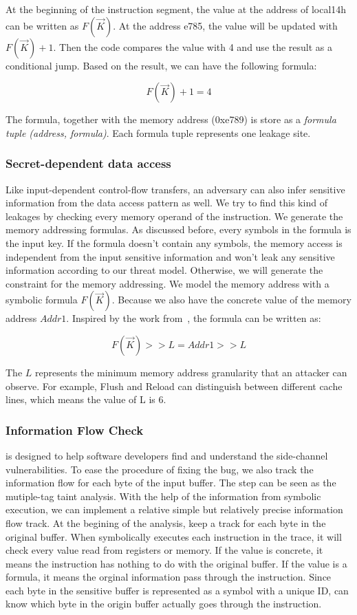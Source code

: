At the beginning of the instruction segment, the value at the 
address of local14h can be written as $F(\vec{K})$. At the address e785, 
the value will be updated with $F(\vec{K})+1$. Then the code compares 
the value with 4 and use the result as a conditional jump. 
Based on the result, we can have the following formula:

$$F(\vec{K}) + 1 = 4$$

The formula, together with the memory address (0xe789) is store
as a \textit{formula tuple (address, formula)}. 
Each formula tuple represents one leakage site.

\subsubsection{Secret-dependent data access}
Like input-dependent control-flow transfers, an adversary can also infer 
sensitive information from the data access pattern as well. 
We try to find this kind of leakages by checking 
every memory operand of the instruction. We generate the memory addressing 
formulas. As discussed before, every symbols in the formula is the input key. 
If the formula doesn’t contain any symbols, the memory access is independent 
from the input sensitive information and won’t leak any sensitive information 
according to our threat model. Otherwise, we will generate the constraint for
the memory addressing. We model the memory address with a symbolic formula 
$F(\vec{K})$. 
Because we also have the concrete value of the memory address $Addr1$. 
Inspired by the work from~\cite{203878}, the formula can be written as:

$$F(\vec{K}) >> L = Addr1 >> L$$

The $L$ represents the minimum memory address granularity that an attacker 
can observe. For example, Flush and Reload can distinguish between different
cache lines, which means the value of L is 6.

\subsubsection{Information Flow Check}
\tool{} is designed to help software developers find and understand the 
side-channel vulnerabilities. To ease the procedure of fixing the bug,
we also track the information flow for each byte of the input
buffer. 
The step can be seen as the mutiple-tag taint analysis.
With the help of the information from symbolic execution, we can implement
a relative simple but relatively precise information flow track.
At the begining of the analysis, \tool{} keep a track for each byte 
in the original buffer. When \tool{} symbolically executes each
instruction in the trace, it will check every value read from
registers or memory. If the value is concrete, it means the
instruction has nothing to do with the original buffer.
If the value is a formula, it means the orginal information
pass through the instruction. Since each byte in the sensitive
buffer is represented as a symbol with a unique ID, \tool{} can
know which byte in the origin buffer actually goes through the
instruction.





